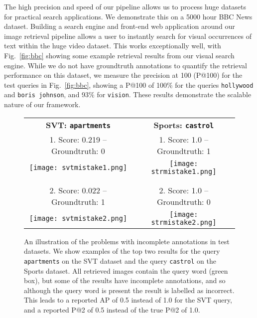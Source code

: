 \documentclass[twocolumn]{svjour3}          \smartqed  \usepackage{epsfig}
\begin{document}
The high precision and speed of our pipeline allows us to process huge datasets for practical search applications. We demonstrate this on a 5000 hour BBC News dataset. Building a search engine and front-end web application around our image retrieval pipeline allows a user to instantly search for visual occurrences of text within the huge video dataset. This works exceptionally well, with Fig.~\ref{fig:bbc} showing some example retrieval results from our visual search engine. While we do not have groundtruth annotations to quantify the retrieval performance on this dataset, we measure the precision at 100 (P@100) for the test queries in Fig.~\ref{fig:bbc}, showing a P@100 of 100\% for the queries \texttt{hollywood} and \texttt{boris johnson}, and 93\% for \texttt{vision}. These results demonstrate the scalable nature of our framework.

\begin{figure*}
\begin{center}
\begin{tabular}{c|c}
\bf SVT: \texttt{apartments} & \bf Sports: \texttt{castrol}\\
1. Score: 0.219 -- Groundtruth: 0 & 1. Score: 1.0 -- Groundtruth: 1\\
\texttt{[image: svtmistake1.png]}&\texttt{[image: strmistake1.png]}\\
\\
\\
2. Score: 0.022 -- Groundtruth: 1 & 2. Score: 1.0 -- Groundtruth: 0\\
\texttt{[image: svtmistake2.png]}&\texttt{[image: strmistake2.png]}
\end{tabular}
\caption{An illustration of the problems with incomplete annotations in test datasets. We show examples of the top two results for the query \texttt{apartments} on the SVT dataset and the query \texttt{castrol} on the Sports dataset. All retrieved images contain the query word (green box), but some of the results have incomplete annotations, and so although the query word is present the result is labelled as incorrect. This leads to a reported AP of 0.5 instead of 1.0 for the SVT query, and a reported P@2 of 0.5 instead of the true P@2 of 1.0.}
\label{fig:retrievalmistake}
\end{center}
\end{figure*}
\end{document}
